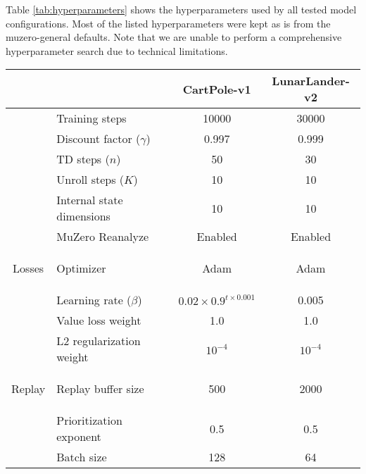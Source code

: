 Table \ref{tab:hyperparameters} shows the hyperparameters used by all tested model configurations. Most of the listed hyperparameters were kept as is from the muzero-general defaults. Note that we are unable to perform a comprehensive hyperparameter search due to technical limitations.
\begin{table}[ht]
    \centering
    \begin{tabular}{|c|l||c|c|}
        \hline
        & & CartPole-v1 & LunarLander-v2 \\
        \hline\hline

        & Training steps & 10000 & 30000 \\
        \cline{2-4}
        & Discount factor ($\gamma$) & 0.997 & 0.999 \\
        \cline{2-4}
        & TD steps ($n$) & 50 & 30 \\
        \cline{2-4}
        & Unroll steps ($K$) & 10 & 10 \\
        \cline{2-4}
        & Internal state dimensions & 10 & 10 \\
        \cline{2-4}
        & MuZero Reanalyze & Enabled & Enabled \\

        \hline

        \multirow{4.1}{*}{\begin{sideways}Losses\end{sideways}} & Optimizer & Adam & Adam \\
        \cline{2-4}
        & Learning rate ($\beta$) & $0.02 \times 0.9^{t \times 0.001}$ & 0.005 \\
        \cline{2-4}
        & Value loss weight & 1.0 & 1.0 \\
        \cline{2-4}
        & L2 regularization weight & $10^{-4}$ & $10^{-4}$ \\

        \hline

        \multirow{3.2}{*}{\begin{sideways}Replay\end{sideways}} & Replay buffer size & 500 & 2000 \\
        \cline{2-4}
        & Prioritization exponent & 0.5 & 0.5 \\
        \cline{2-4}
        & Batch size & 128 & 64 \\

        \hline


\end{tabular}
\end{table}
